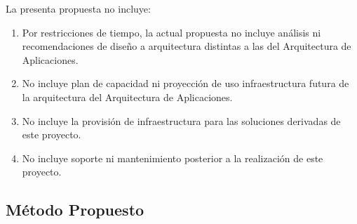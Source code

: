 \documentclass[
	a4paper, %
	12pt, %
]{include/CSSullivanBusinessReport}
\def\tightlist{}
\begin{document}
La presenta propuesta no incluye:

\begin{enumerate}
\def\labelenumi{\arabic{enumi}.}
\tightlist
\item
  Por restricciones de tiempo, la actual propuesta no incluye análisis
  ni recomendaciones de diseño a arquitectura distintas a las del
  Arquitectura de Aplicaciones.
\item
  No incluye plan de capacidad ni proyección de uso infraestructura
  futura de la arquitectura del Arquitectura de Aplicaciones.
\item
  No incluye la provisión de infraestructura para las soluciones
  derivadas de este proyecto.
\item
  No incluye soporte ni mantenimiento posterior a la realización de este
  proyecto.
\end{enumerate}

\subsection{Método Propuesto}\label{sec:muxe9todo-propuesto}

\begin{quote}
\end{quote}
\end{document}
